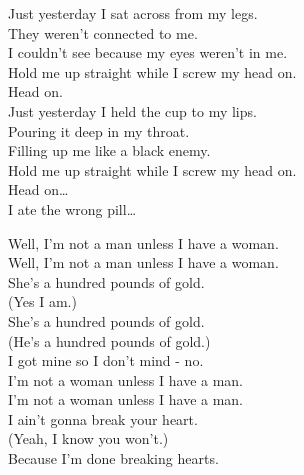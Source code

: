 
\label{album:float-along-fill-your-lungs}




Just yesterday I sat across from my legs. \\
They weren't connected to me. \\
I couldn't see because my eyes weren't in me. \\
Hold me up straight while I screw my head on. \\

Head on. \\

Just yesterday I held the cup to my lips. \\
Pouring it deep in my throat. \\
Filling up me like a black enemy. \\
Hold me up straight while I screw my head on. \\

Head on… \\

I ate the wrong pill… \\




Well, I'm not a man unless I have a woman. \\
Well, I'm not a man unless I have a woman. \\

She's a hundred pounds of gold. \\
(Yes I am.) \\
She's a hundred pounds of gold. \\
(He's a hundred pounds of gold.) \\
I got mine so I don't mind - no. \\

I'm not a woman unless I have a man. \\
I'm not a woman unless I have a man. \\

I ain't gonna break your heart. \\
(Yeah, I know you won't.) \\
Because I'm done breaking hearts. \\

